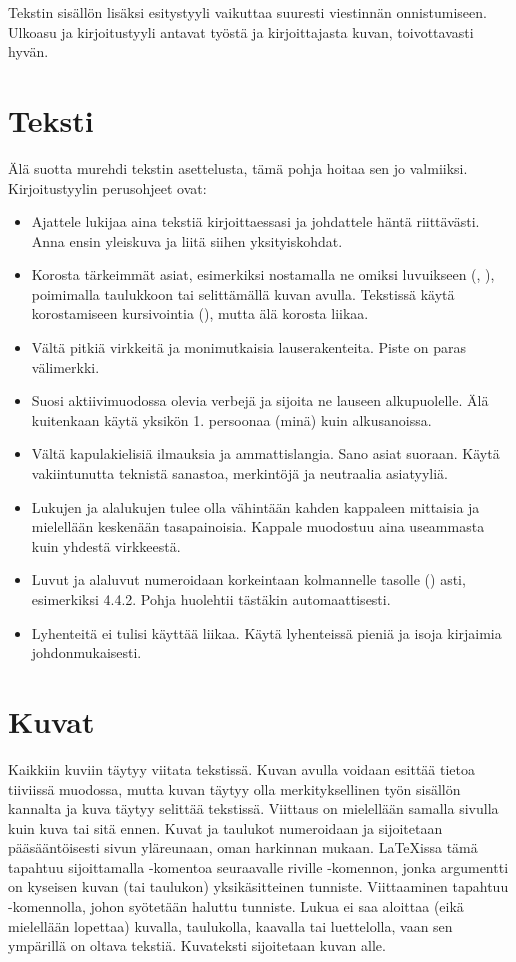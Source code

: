Tekstin sisällön lisäksi esitystyyli vaikuttaa suuresti viestinnän onnistumiseen. Ulkoasu ja kirjoitustyyli antavat työstä ja kirjoittajasta kuvan, toivottavasti hyvän.

\section{Teksti}

Älä suotta murehdi tekstin asettelusta, tämä pohja hoitaa sen jo valmiiksi. Kirjoitustyylin perusohjeet ovat:

\begin{itemize}
\item Ajattele lukijaa aina tekstiä kirjoittaessasi ja johdattele häntä riittävästi. Anna ensin yleiskuva ja liitä siihen yksityiskohdat. 
\item Korosta tärkeimmät asiat, esimerkiksi nostamalla ne omiksi luvuikseen (, ), poimimalla taulukkoon tai selittämällä kuvan avulla. Tekstissä käytä korostamiseen kursivointia (), mutta älä korosta liikaa.
\item Vältä pitkiä virkkeitä ja monimutkaisia lauserakenteita. Piste on paras välimerkki. 
\item Suosi aktiivimuodossa olevia verbejä ja sijoita ne lauseen alkupuolelle. Älä kuitenkaan käytä yksikön 1. persoonaa (minä) kuin alkusanoissa. 
\item Vältä kapulakielisiä ilmauksia ja ammattislangia. Sano asiat suoraan. Käytä vakiintunutta teknistä sanastoa, merkintöjä ja neutraalia asiatyyliä. 
\item Lukujen ja alalukujen tulee olla vähintään kahden kappaleen mittaisia ja mielellään keskenään tasapainoisia. Kappale muodostuu aina useammasta kuin yhdestä virkkeestä. 
\item Luvut ja alaluvut numeroidaan korkeintaan kolmannelle tasolle () asti, esimerkiksi 4.4.2. Pohja huolehtii tästäkin automaattisesti.
\item Lyhenteitä ei tulisi käyttää liikaa. Käytä lyhenteissä pieniä ja isoja kirjaimia johdonmukaisesti. 
\end{itemize}

\section{Kuvat}

Kaikkiin kuviin täytyy viitata tekstissä. Kuvan avulla voidaan esittää tietoa tiiviissä muodossa, mutta kuvan täytyy olla merkityksellinen työn sisällön kannalta ja kuva täytyy selittää tekstissä. Viittaus on mielellään samalla sivulla kuin kuva tai sitä ennen. Kuvat ja taulukot numeroidaan ja sijoitetaan pääsääntöisesti sivun yläreunaan, oman harkinnan mukaan. \LaTeX{}issa tämä tapahtuu sijoittamalla -komentoa seuraavalle riville -komennon, jonka argumentti on kyseisen kuvan (tai taulukon) yksikäsitteinen tunniste. Viittaaminen tapahtuu -komennolla, johon syötetään haluttu tunniste. Lukua ei saa aloittaa (eikä mielellään lopettaa) kuvalla, taulukolla, kaavalla tai luettelolla, vaan sen ympärillä on oltava tekstiä. Kuvateksti sijoitetaan kuvan alle.

